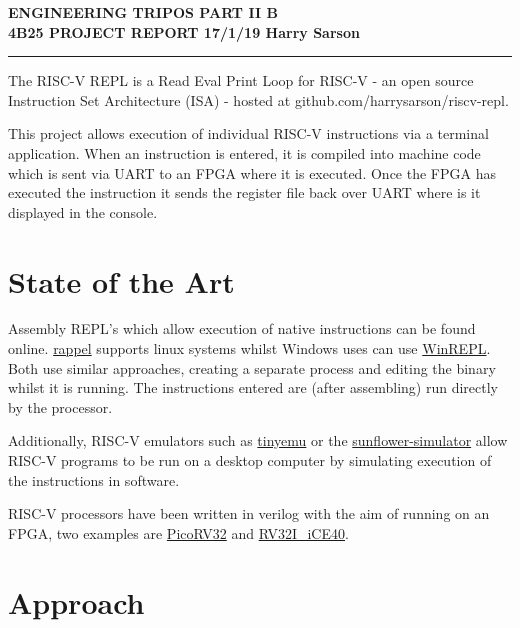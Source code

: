\documentclass[10pt]{article}
\begin{document}

\begin{center}
{\bf ENGINEERING TRIPOS PART II B} \\
\vspace{0.2cm}
{\bf 4B25 PROJECT REPORT \hfill 17/1/19 \hfill Harry Sarson}
\vspace{0.2cm}
\rule{15.7cm}{0.5mm}
\end{center}

\begin{multicols}{2}

The RISC-V REPL is a Read Eval Print Loop for RISC-V - an open source Instruction Set Architecture (ISA)\cite{riscv-homepage} - hosted at github.com/harrysarson/riscv-repl.

This project allows execution of individual RISC-V instructions via a terminal application.
When an instruction is entered, it is compiled into machine code which is sent via UART to an FPGA where it is executed.
Once the FPGA has executed the instruction it sends the register file back over UART where is it displayed in the console.

\section{State of the Art}

Assembly REPL's which allow execution of native instructions can be found online.
\href{https://github.com/yrp604/rappel}{rappel} supports linux systems whilst Windows uses can use \href{https://github.com/zerosum0x0/WinREPL}{WinREPL}.
Both use similar approaches, creating a separate process and editing the binary whilst it is running.
The instructions entered are (after assembling) run directly by the processor.

Additionally, RISC-V emulators such as \href{https://bellard.org/tinyemu/}{tinyemu} or the \href{https://github.com/phillipstanleymarbell/sunflower-simulator}{sunflower-simulator} allow RISC-V programs to be run on a desktop computer by simulating execution of the instructions in software\cite{tinyemu}\cite{sunflower}.

RISC-V processors have been written in verilog with the aim of running on an FPGA, two examples are \href{https://github.com/cliffordwolf/picorv32}{PicoRV32} and \href{https://github.com/physical-computation/RV32I_iCE40}{RV32I\_iCE40}\cite{picorv32}\cite{RV32I_iCE40}.

\section{Approach}


\end{multicols}
\end{document}
